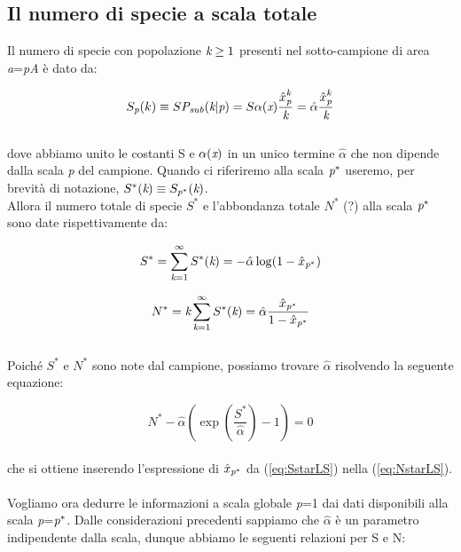 \subsection{Il numero di specie a scala totale}
Il numero di specie con popolazione $\emph{k} \ge 1$ presenti nel sotto-campione di area \emph{a}=\emph{pA} è dato da:

\begin{equation}
S_\emph{p}(k) \equiv S\emph{P}_\emph{sub}(\emph{k}|\emph{p})=S\alpha(\emph{x})\frac{\emph{$\hat x$}^\emph{k}_\emph{p}}{\emph{k}}=\hat \alpha \frac{\emph{$\hat x$}^\emph{k}_\emph{p}}{\emph{k}}
\end{equation} 
\\
dove abbiamo unito le costanti S e $\alpha (\emph{x})$ in un unico termine $\hat \alpha$ che non dipende dalla scala \emph{p} del campione. Quando ci riferiremo alla scala $\emph{p}^*$ useremo, per brevità di notazione, $S^*(\emph{k})\equiv S_{\emph{p}^*}(\emph{k})$.\\
Allora il numero totale di specie $S^*$ e l'abbondanza totale $N^*$ (?) alla scala $\emph{p}^*$ sono date rispettivamente da:

\begin{equation}
S^*=\sum_{\emph{k}=1}^\infty S^*(\emph{k})=-\hat \alpha \log (1-\emph{$\hat x$}_{\emph{p}^*})
\label{eq:SstarLS}
\end{equation}

\begin{equation}
N^*=\emph{k}\sum_{\emph{k}=1}^\infty S^*(\emph{k})=\hat \alpha \frac{\emph{$\hat x$}_{\emph{p}^*}}{1-\emph{$\hat x$}_{\emph{p}^*}}
\label{eq:NstarLS}
\end{equation}
\\
Poiché $S^*$ e $N^*$ sono note dal campione, possiamo trovare $\hat \alpha$ risolvendo la seguente equazione:

\begin{equation}
N^*- \hat \alpha(\exp( \frac{S^*}{\hat \alpha})-1)=0
\label{eq:solve}
\end{equation}
\\
che si ottiene inserendo l'espressione di $  \emph{$\hat x$}_{\emph{p}^*} $ da (\ref{eq:SstarLS}) nella (\ref{eq:NstarLS}).
\\ \\
Vogliamo ora dedurre le informazioni a scala globale \emph{p}=1 dai dati disponibili alla scala \emph{p}=$\emph{p}^*$. Dalle considerazioni precedenti sappiamo che $ \hat \alpha$ è un parametro indipendente dalla scala, dunque abbiamo le seguenti relazioni per S e N:


